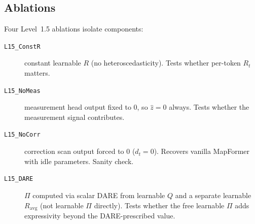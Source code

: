 \subsection{Ablations}

Four Level~1.5 ablations isolate components:
\begin{description}
  \item[\texttt{L15\_ConstR}] constant learnable $R$ (no
  heteroscedasticity). Tests whether per-token $R_t$ matters.
  \item[\texttt{L15\_NoMeas}] measurement head output fixed to 0, so
  $\hat z = 0$ always. Tests whether the measurement signal contributes.
  \item[\texttt{L15\_NoCorr}] correction scan output forced to 0
  ($d_t = 0$). Recovers vanilla MapFormer with idle parameters. Sanity
  check.
  \item[\texttt{L15\_DARE}] $\Pi$ computed via scalar DARE from
  learnable $Q$ and a separate learnable $R_\mathrm{avg}$ (not
  learnable $\Pi$ directly). Tests whether the free learnable $\Pi$ adds
  expressivity beyond the DARE-prescribed value.
\end{description}
